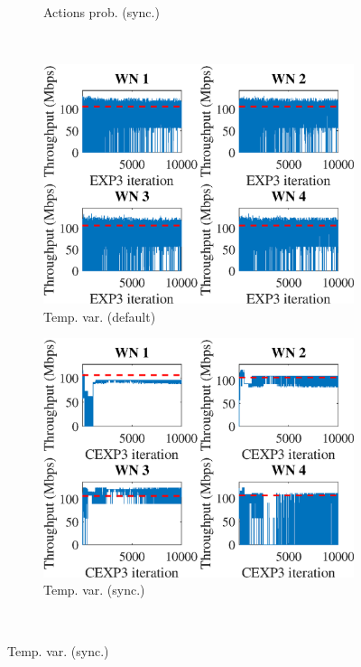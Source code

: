 \documentclass[preprint,12pt]{article}
\begin{document}
\begin{figure}[h!]
\begin{subfigure}[b]{.3\textwidth}
		\caption{Actions prob. (sync.)}\label{fig:hist_actions_CEXP3}
	\end{subfigure}\\
	\begin{subfigure}[b]{.3\textwidth}
		\includegraphics[width=\textwidth]{images/temporal_individual_tpt_EXP3}
		\caption{Temp. var.  (default)}\label{fig:temporal_individual_tpt_EXP3}
	\end{subfigure}
	\begin{subfigure}[b]{.3\textwidth}
		\includegraphics[width=\textwidth]{images/temporal_individual_tpt_CEXP3}
		\caption{Temp. var.  (sync.)}\label{fig:temporal_individual_tpt_CEXP3}
	\end{subfigure}\\

\end{figure}
\end{document}
